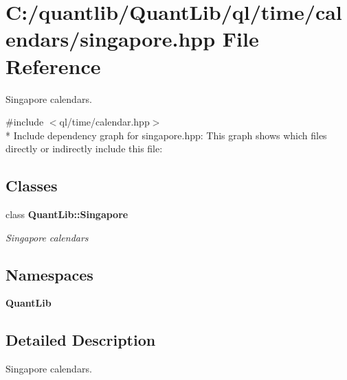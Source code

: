 \section{C\+:/quantlib/\+Quant\+Lib/ql/time/calendars/singapore.hpp File Reference}
\label{singapore_8hpp}


Singapore calendars.  


{\ttfamily \#include $<$ql/time/calendar.\+hpp$>$}\\*
Include dependency graph for singapore.\+hpp\+:
This graph shows which files directly or indirectly include this file\+:
\subsection*{Classes}
\begin{DoxyCompactItemize}
\item 
class {\bf Quant\+Lib\+::\+Singapore}
\begin{DoxyCompactList}\small\item\em Singapore calendars \end{DoxyCompactList}\end{DoxyCompactItemize}
\subsection*{Namespaces}
\begin{DoxyCompactItemize}
\item 
 {\bf Quant\+Lib}
\end{DoxyCompactItemize}


\subsection{Detailed Description}
Singapore calendars. 

